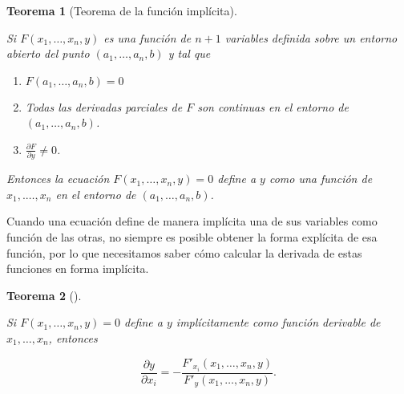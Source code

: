 \documentclass[
  a4paper,
]{scrreport}
\providecommand{\tightlist}{%
  \setlength{\itemsep}{0pt}\setlength{\parskip}{0pt}}\usepackage{longtable,booktabs,array}
\theoremstyle{plain}
\newtheorem{theorem}{Teorema}[chapter]
\theoremstyle{definition}
\theoremstyle{plain}
\theoremstyle{plain}
\theoremstyle{definition}
\theoremstyle{definition}
\theoremstyle{remark}
\begin{document}
\begin{theorem}[Teorema de la función
implícita]\protect\hypertarget{thm-funcion-implicita}{}\label{thm-funcion-implicita}

Si \(F(x_1,\ldots,x_n,y)\) es una función de \(n+1\) variables definida
sobre un entorno abierto del punto \((a_1,\ldots,a_n,b)\) y tal que

\begin{enumerate}
\def\labelenumi{\alph{enumi}.}
\tightlist
\item
  \(F(a_1,\ldots,a_n,b)=0\)
\item
  Todas las derivadas parciales de \(F\) son continuas en el entorno de
  \((a_1,\ldots,a_n,b)\).
\item
  \(\frac{\partial F}{\partial y}\neq 0\).
\end{enumerate}

Entonces la ecuación \(F(x_1,\ldots,x_n,y)=0\) define a \(y\) como una
función de \(x_1, .\ldots, x_n\) en el entorno de
\((a_1,\ldots,a_n,b)\).

\end{theorem}

Cuando una ecuación define de manera implícita una de sus variables como
función de las otras, no siempre es posible obtener la forma explícita
de esa función, por lo que necesitamos saber cómo calcular la derivada
de estas funciones en forma implícita.

\begin{theorem}[]\protect\hypertarget{thm-derivada-implicita-funcion-varias-variables}{}\label{thm-derivada-implicita-funcion-varias-variables}

Si \(F(x_1,\ldots,x_n,y)=0\) define a \(y\) implícitamente como función
derivable de \(x_1,\ldots,x_n\), entonces

\[
\frac{\partial y}{\partial x_i} = -\frac{F'_{x_i}(x_1,\ldots,x_n,y)}{F'_{y}(x_1,\ldots,x_n,y)}.
\]

\end{theorem}
\end{document}
